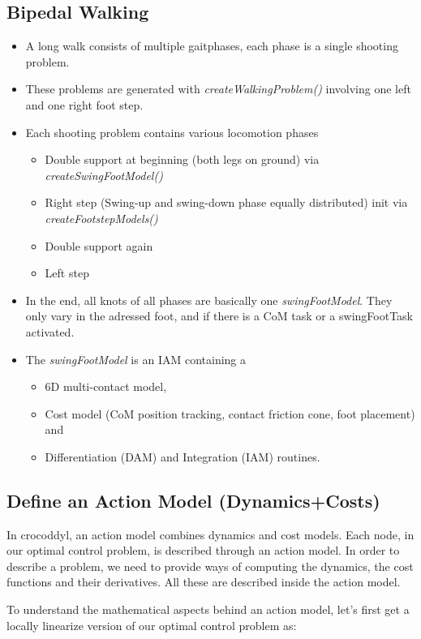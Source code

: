 \subsection{Bipedal Walking}
\begin{itemize}
\item A long walk consists of multiple gaitphases, each phase is a single shooting problem.
\item These problems are generated with \textit{createWalkingProblem()} involving one left and one right foot step.
\item Each shooting problem contains various locomotion phases
	\begin{itemize}
	\item Double support at beginning (both legs on ground) via \textit{createSwingFootModel()}
	\item Right step (Swing-up and swing-down phase equally distributed) init via    	\textit{createFootstepModels()}
	\item Double support again
	\item Left step
	\end{itemize}	
\item In the end, all knots of all phases are basically one \textit{swingFootModel}. They only vary in the adressed foot, and if there is a CoM task or a swingFootTask activated.
\item The \textit{swingFootModel} is an IAM containing a 
	\begin{itemize}
	\item 6D multi-contact model,
	\item Cost model (CoM position tracking, contact friction cone, foot placement) and
	\item Differentiation (DAM) and Integration (IAM) routines.
	\end{itemize}
\end{itemize}


\subsection{Define an Action Model (Dynamics+Costs)}
In crocoddyl, an action model combines dynamics and cost models. Each node, in our optimal control problem, is described through an action model. In order to describe a problem, we need to provide ways of computing the dynamics, the cost functions and their derivatives. All these are described inside the action model.

To understand the mathematical aspects behind an action model, let's first get a locally linearize version of our optimal control problem as:

